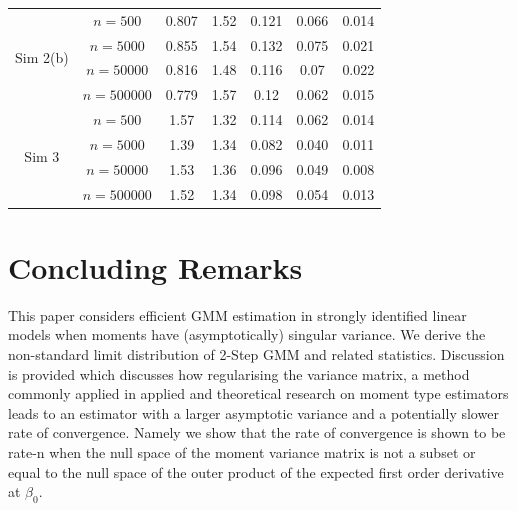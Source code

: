 \documentclass[11pt, fleqn]{article}
\begin{document}
\begin{table}[H]
\begin{center}
\begin{tabular}{|cc|cc|ccc|}
  \multirow{4}{*}{\begin{sideways}\parbox{2cm}{\centering Sim 2(b)}\end{sideways}}

&\hspace{-0.7cm}$ n=500$      &0.807 &1.52  &0.121  & 0.066    & 0.014   \\  [0.18cm]
&\hspace{-0.65cm}$n=5000$     &0.855  &1.54  &0.132  & 0.075    & 0.021  \\ [0.18cm]
&\hspace{-0.5cm}$n=50000$     &0.816  & 1.48 &0.116  & 0.07     & 0.022   \\  [0.18cm]
&\hspace{-0.30cm}$n=500000$   &0.779  &1.57  &0.12   &0.062     & 0.015    \\ [0.18cm]

\hline


  \multirow{4}{*}{\begin{sideways}\parbox{2cm}{\centering Sim 3}\end{sideways}}

&\hspace{-0.7cm}$ n=500$      &1.57 &1.32  &0.114  &0.062    &0.014    \\  [0.18cm]
&\hspace{-0.7cm}$n=5000$      &1.39 &1.34  &0.082  &0.040    &0.011   \\ [0.18cm]
&\hspace{-0.5cm}$n=50000$     &1.53 &1.36  &0.096  &0.049    &0.008    \\  [0.18cm]
&\hspace{-0.30cm}$n=500000$   &1.52 &1.34  &0.098  &0.054    &0.013     \\ [0.18cm]


  \hline

\end{tabular} \end{center}
\end{table}




\section{Concluding Remarks}


This paper considers efficient GMM estimation in strongly identified linear models when moments have (asymptotically) singular variance. We derive the non-standard limit distribution of 2-Step GMM and related statistics. Discussion is provided which discusses how regularising the variance matrix, a method commonly applied in applied and theoretical research on moment type estimators leads to an estimator with a larger asymptotic variance and a potentially slower rate of convergence. Namely we show that the rate of convergence is shown to be rate-n when the null space of the moment variance matrix is not a subset or equal to the null space of the outer product of the expected first order derivative at $\beta_0$.
\end{document}
